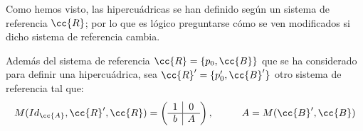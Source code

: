 Como hemos visto, las hipercuádricas se han definido según un sistema de referencia $\cc{R}$; por lo que es lógico preguntarse cómo se ven modificados si dicho sistema de referencia cambia.

Además del sistema de referencia $\cc{R}=\{p_0,\cc{B}\}$ que se ha considerado para definir una hipercuádrica, sea $\cc{R}'=\{p_0', \cc{B}'\}$ otro sistema de referencia tal que:
\begin{equation*}
    M(Id_{\cc{A}}, \cc{R}', \cc{R}) = \left(\begin{array}{c|c}
        1 & 0 \\ \hline
        b & A
    \end{array}\right),\hspace{1cm} A = M(\cc{B}', \cc{B})
\end{equation*}

